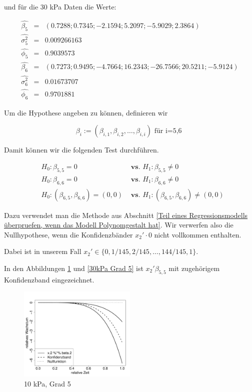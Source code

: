 \documentclass[12pt,a4paper]{article}
\theoremstyle{definition}
\theoremstyle{definition}
\theoremstyle{definition}
\theoremstyle{definition}
\begin{document}
und für die 30 kPa Daten die Werte:

\begin{eqnarray*}
\hat{\beta_{5}} &=& (0.7288 ; 0.7345 ; -2.1594 ; 5.2097 ; -5.9029 ; 2.3864)  \\
\hat{\sigma_{5}^2} &=& 0.009266163 \\
\hat{\phi_{5}} &=& 0.9039573 \\
\hat{\beta_{6}} &=& (0.7273 ; 0.9495 ; -4.7664 ; 16.2343 ; -26.7566 ; 20.5211 ; -5.9124)  \\
\hat{\sigma_{6}^2} &=& 0.01673707 \\
\hat{\phi_{6}} &=& 0.9701881
\end{eqnarray*}

Um die Hypothese angeben zu können, definieren wir 

\begin{equation*}
\beta_{i} := (\beta_{i,1}, \beta_{i,2}, \ldots, \beta_{i,i}) \text{ für i=5,6 }
\end{equation*}

Damit können wir die folgenden Test durchführen.

\begin{eqnarray*}
&H_0 : \beta_{5,5} = 0 &\textbf{ vs. } H_1 : \beta_{5,5} \neq 0 \\
&H_0 : \beta_{6,6} = 0 &\textbf{ vs. } H_1 : \beta_{6,6} \neq 0 \\
&H_0 : (\beta_{6,5}, \beta_{6,6}) = (0,0) &\textbf{ vs. } H_1 : (\beta_{6,5}, \beta_{6,6}) \neq (0,0)
\end{eqnarray*}

Dazu verwendet man die Methode aus Abschnitt \ref{Teil eines Regressionsmodells überpruefen, wenn das Modell Polynomgestalt hat}. Wir verwerfen also die Nullhypothese, wenn die Konfidenzbänder $x_2' \cdot 0$ nicht vollkommen enthalten. 

Dabei ist in unserem Fall $x_2' \in \{0, 1/145, 2/145, \ldots, 144/145, 1 \}.$ 

In den Abbildungen \ref{10kPa Grad 5} und \ref{30kPa Grad 5} ist $x_2' \beta_{5,5}$ mit zugehörigem Konfidenzband eingezeichnet.

\begin{figure}[H] 
  \centering
     \includegraphics[width=0.5\textwidth]{10kPa-Grad-5-KB}
  \caption{10 kPa, Grad 5}
  \label{10kPa Grad 5}
\end{figure}
\end{document}

